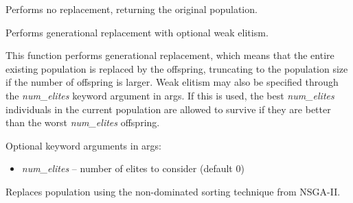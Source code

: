 \documentclass[letterpaper,10pt,english]{sphinxmanual}
\begin{document}

\begin{fulllineitems}
\label{reference:inspyred.ec.replacers.default_replacement}
Performs no replacement, returning the original population.

\end{fulllineitems}


\begin{fulllineitems}
\label{reference:inspyred.ec.replacers.generational_replacement}
Performs generational replacement with optional weak elitism.

This function performs generational replacement, which means that
the entire existing population is replaced by the offspring,
truncating to the population size if the number of offspring is 
larger. Weak elitism may also be specified through the \emph{num\_elites}
keyword argument in args. If this is used, the best \emph{num\_elites}
individuals in the current population are allowed to survive if
they are better than the worst \emph{num\_elites} offspring.

Optional keyword arguments in args:
\begin{itemize}
\item {} 
\emph{num\_elites} -- number of elites to consider (default 0)

\end{itemize}

\end{fulllineitems}


\begin{fulllineitems}
\label{reference:inspyred.ec.replacers.nsga_replacement}
Replaces population using the non-dominated sorting technique from NSGA-II.

\end{fulllineitems}
\end{document}

